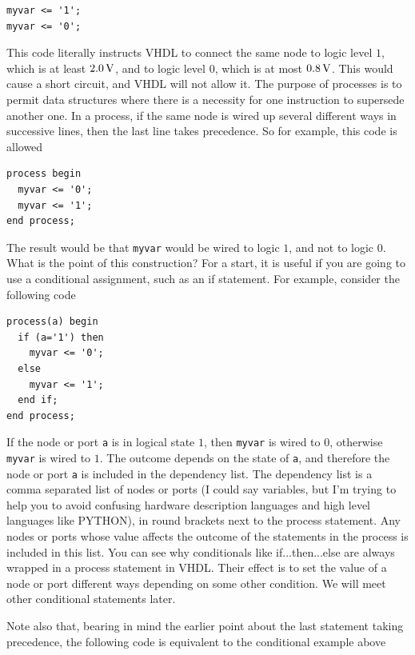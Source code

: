 \documentclass[../physical_computing.tex]{subfiles}
\begin{document}
\begin{verbatim}
myvar <= '1';
myvar <= '0';
\end{verbatim}

This code literally instructs VHDL to connect the same node to logic level $1$, which is at least $\rm 2.0\,V$, and to logic level $0$, which is at most $\rm 0.8\,V$. This would cause a short circuit, and VHDL will not allow it. The purpose of processes is to permit data structures where there is a necessity for one instruction to supersede another one. In a process, if the same node is wired up several different ways in successive lines, then the last line takes precedence. So for example, this code is allowed

\begin{verbatim}
process begin
  myvar <= '0';
  myvar <= '1';
end process;
\end{verbatim}

The result would be that \texttt{myvar} would be wired to logic $1$, and not to logic $0$. What is the point of this construction? For a start, it is useful if you are going to use a conditional assignment, such as an if statement. For example, consider the following code

\begin{verbatim}
process(a) begin
  if (a='1') then
    myvar <= '0'; 
  else
    myvar <= '1';
  end if;
end process;
\end{verbatim}

If the node or port \texttt{a} is in logical state $1$, then \texttt{myvar} is wired to $0$, otherwise \texttt{myvar} is wired to $1$. The outcome depends on the state of \texttt{a}, and therefore the node or port \texttt{a} is included in the dependency list. The dependency list is a comma separated list of nodes or ports (I could say variables, but I'm trying to help you to avoid confusing hardware description languages and high level languages like PYTHON), in round brackets next to the process statement. Any nodes or ports whose value affects the outcome of the statements in the process is included in this list. You can see why conditionals like if...then...else are always wrapped in a process statement in VHDL. Their effect is to set the value of a node or port different ways depending on some other condition. We will meet other conditional statements later. 

Note also that, bearing in mind the earlier point about the last statement taking precedence, the following code is equivalent to the conditional example above
\end{document}
